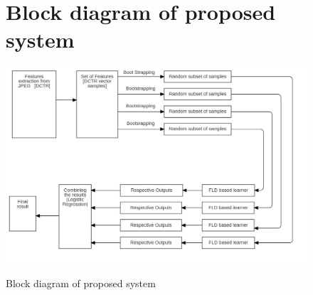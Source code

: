 \begin{figure}[H]
\section {Block diagram of proposed system}
                \includegraphics[width=1.1\textwidth]{./img/block_d.jpg}\\
\caption{ Block diagram of proposed system}
\end{figure}
\clearpage

